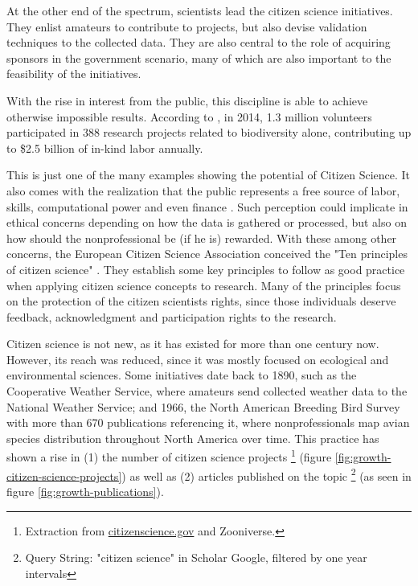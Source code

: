 At the other end of the spectrum, scientists lead the citizen science initiatives. They enlist amateurs to contribute to projects, but also devise validation techniques to the collected data. They are also central to the role of acquiring sponsors in the government scenario, many of which are also important to the feasibility of the initiatives.

With the rise in interest from the public, this discipline is able to achieve otherwise impossible results. According to \cite{theobald2015global}, in 2014, 1.3 million volunteers participated in 388 research projects related to biodiversity alone, contributing up to \$2.5 billion of in-kind labor annually.

This is just one of the many examples showing the potential of Citizen Science. It also comes with the realization that the public represents a free source of labor, skills, computational power and even finance \cite{silvertown2009new}. Such perception could implicate in ethical concerns depending on how the data is gathered or processed, but also on how should the nonprofessional be (if he is) rewarded. With these among other concerns, the European Citizen Science Association conceived the "Ten principles of citizen science" \cite{robinson2018ten}. They establish some key principles to follow as good practice when applying citizen science concepts to research. Many of the principles focus on the protection of the citizen scientists rights, since those individuals deserve feedback, acknowledgment and participation rights to the research.


Citizen science is not new, as it has existed for more than one century now. However, its reach was reduced, since it was mostly focused on ecological and environmental sciences. Some initiatives date back to 1890, such as the Cooperative Weather Service, where amateurs send collected weather data to the National Weather Service; and 1966, the North American Breeding Bird Survey with more than 670 publications referencing it, where nonprofessionals map avian species distribution throughout North America over time. This practice has shown a rise in (1) the number of citizen science projects \footnote{Extraction from \href{citizenscience.gov}{citizenscience.gov} and Zooniverse.} (figure \ref{fig:growth-citizen-science-projects}) as well as (2) articles published on the topic \footnote{Query String: "citizen science" in Scholar Google, filtered by one year intervals} (as seen in figure \ref{fig:growth-publications}).

